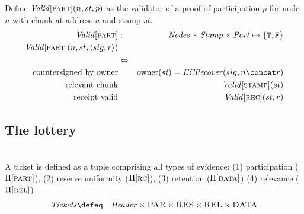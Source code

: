 \begin{definition}
\label{def:pop-validity}
Define $\mathit{Valid}[\textsc{\lowercase{PART}}](n,st,p)$ as the validator of a proof of participation $p$ for node $n$ with chunk at address $a$ and stamp $st$.
\begin{eqnarray}
\mathit{Valid}[\textsc{\lowercase{PART}}]  &:& \mathit{Nodes}\times\mathit{Stamp}\times\mathit{Part}\mapsto \{\mathtt{T,F}\}\\
\mathit{Valid}[\textsc{\lowercase{PART}}](n,st,\langle sig, r\rangle)\\
&\Leftrightarrow&\\
\text{countersigned by owner} && \mathrm{owner}(st) = \mathit{ECRecover}(sig, n\concat r) \\
\text{relevant chunk}&&\mathit{Valid}[\textsc{\lowercase{STAMP}}](st)\\   
\text{receipt valid}&&\mathit{Valid}[\textsc{\lowercase{REC}}](st,r)
\end{eqnarray}
\end{definition}

\subsection{The lottery}

\begin{definition}
\label{def:lottery} 
\begin{eqnarray}
\end{eqnarray}
\end{definition}

\begin{definition}
\label{def:ticket}
A ticket is defined as a tuple comprising all types of evidence:
(1) participation ($\Pi[\textsc{\lowercase{PART}}]$), (2) reserve uniformity ($\Pi[\textsc{\lowercase{RC}}]$), (3) retention ($\Pi[\textsc{\lowercase{DATA}}]$) (4) relevance ($\Pi[\textsc{\lowercase{REL}}]$) 
\begin{eqnarray}
\mathit{Tickets}&\defeq&\mathit{Header}\times\textsc{PAR}\times\textsc{RES}\times\textsc{REL}\times\textsc{DATA}
\end{eqnarray}
\end{definition}


\begin{definition}
\label{def:ticket-validity}

\end{definition}

